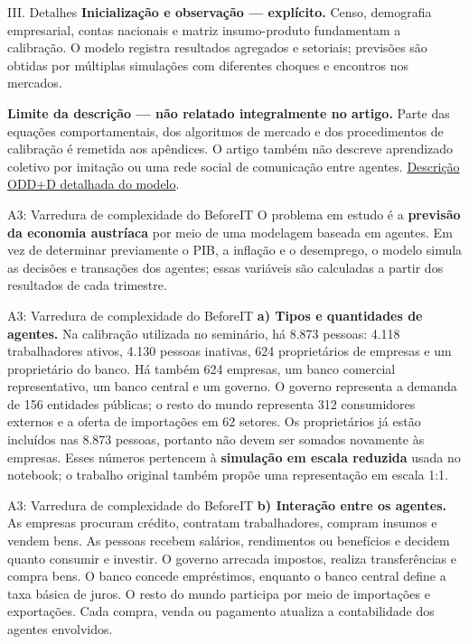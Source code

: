 \documentclass[aspectratio=169,11pt]{beamer}
\begin{document}
\begin{frame}[allowframebreaks]{III. Detalhes}
\normalsize
\textbf{Inicialização e observação --- explícito.} Censo, demografia empresarial, contas nacionais e matriz insumo-produto fundamentam a calibração. O modelo registra resultados agregados e setoriais; previsões são obtidas por múltiplas simulações com diferentes choques e encontros nos mercados.

\textbf{Limite da descrição --- não relatado integralmente no artigo.} Parte das equações comportamentais, dos algoritmos de mercado e dos procedimentos de calibração é remetida aos apêndices. O artigo também não descreve aprendizado coletivo por imitação ou uma rede social de comunicação entre agentes. \href{/Users/danielbandrade/Documents/programing/BeforeIT-dba/dba-studies/model-mechanics/odd-d-description.md}{Descrição ODD+D detalhada do modelo}.
\end{frame}


\begin{frame}[allowframebreaks]{A3: Varredura de complexidade do BeforeIT}
\normalsize
O problema em estudo é a \textbf{previsão da economia austríaca} por meio de uma modelagem baseada em agentes. Em vez de determinar previamente o PIB, a inflação e o desemprego, o modelo simula as decisões e transações dos agentes; essas variáveis são calculadas a partir dos resultados de cada trimestre.
\end{frame}


\begin{frame}[allowframebreaks]{A3: Varredura de complexidade do BeforeIT}
\normalsize
\textbf{a) Tipos e quantidades de agentes.} Na calibração utilizada no seminário, há 8.873 pessoas: 4.118 trabalhadores ativos, 4.130 pessoas inativas, 624 proprietários de empresas e um proprietário do banco. Há também 624 empresas, um banco comercial representativo, um banco central e um governo. O governo representa a demanda de 156 entidades públicas; o resto do mundo representa 312 consumidores externos e a oferta de importações em 62 setores. Os proprietários já estão incluídos nas 8.873 pessoas, portanto não devem ser somados novamente às empresas. Esses números pertencem à \textbf{simulação em escala reduzida} usada no notebook; o trabalho original também propõe uma representação em escala 1:1.
\end{frame}


\begin{frame}[allowframebreaks]{A3: Varredura de complexidade do BeforeIT}
\normalsize
\textbf{b) Interação entre os agentes.} As empresas procuram crédito, contratam trabalhadores, compram insumos e vendem bens. As pessoas recebem salários, rendimentos ou benefícios e decidem quanto consumir e investir. O governo arrecada impostos, realiza transferências e compra bens. O banco concede empréstimos, enquanto o banco central define a taxa básica de juros. O resto do mundo participa por meio de importações e exportações. Cada compra, venda ou pagamento atualiza a contabilidade dos agentes envolvidos.
\end{frame}
\end{document}

